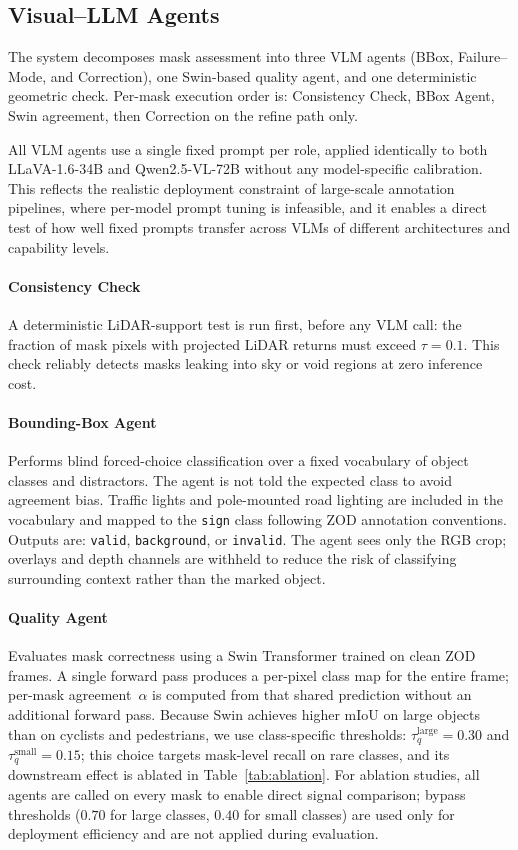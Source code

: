 \documentclass[conference]{IEEEtran}
\begin{document}
\subsection{Visual--LLM Agents}

The system decomposes mask assessment into three VLM agents (BBox, Failure--Mode, and Correction), one Swin-based quality agent, and one deterministic geometric check. 
Per-mask execution order is: Consistency Check, BBox Agent, Swin agreement, then Correction on the refine path only.

All VLM agents use a single fixed prompt per role, applied identically to both LLaVA-1.6-34B and Qwen2.5-VL-72B without any model-specific calibration.
This reflects the realistic deployment constraint of large-scale annotation pipelines, where per-model prompt tuning is infeasible, and it enables a direct test of how well fixed prompts transfer across VLMs of different architectures and capability levels.

\paragraph{Consistency Check}
A deterministic LiDAR-support test is run first, before any VLM call: the fraction of mask pixels with projected LiDAR returns must exceed $\tau{=}0.1$. 
This check reliably detects masks leaking into sky or void regions at zero inference cost.

\paragraph{Bounding-Box Agent}
Performs blind forced-choice classification over a fixed vocabulary of object classes and distractors. 
The agent is not told the expected class to avoid agreement bias. 
Traffic lights and pole-mounted road lighting are included in the vocabulary and mapped to the \texttt{sign} class following ZOD annotation conventions. 
Outputs are: \texttt{valid}, \texttt{background}, or \texttt{invalid}. 
The agent sees only the RGB crop; overlays and depth channels are withheld to reduce the risk of classifying surrounding context rather than the marked object.

\paragraph{Quality Agent}
Evaluates mask correctness using a Swin Transformer \cite{liu2021swin} trained on clean ZOD frames. 
A single forward pass produces a per-pixel class map for the entire frame; per-mask agreement~$\alpha$ is computed from that shared prediction without an additional forward pass. 
Because Swin achieves higher mIoU on large objects than on cyclists and pedestrians, we use class-specific thresholds: $\tau_q^{\text{large}}{=}0.30$ and $\tau_q^{\text{small}}{=}0.15$; this choice targets mask-level recall on rare classes, and its downstream effect is ablated in Table~\ref{tab:ablation}.
For ablation studies, all agents are called on every mask to enable direct signal comparison; bypass thresholds ($0.70$ for large classes, $0.40$ for small classes) are used only for deployment efficiency and are not applied during evaluation.
\end{document}
